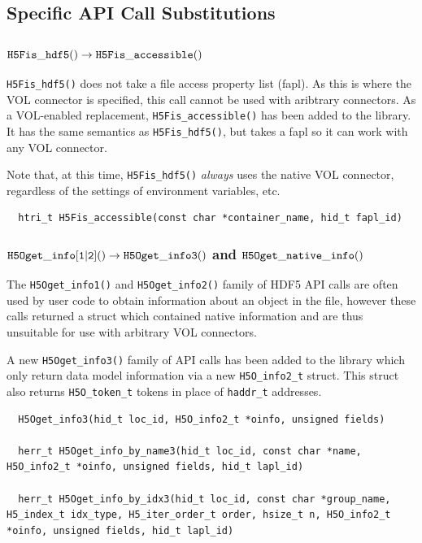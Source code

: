 \subsection{Specific API Call Substitutions}


\subsubsection{${\tt H5Fis\_hdf5()} \rightarrow {\tt H5Fis\_accessible()}$}

{\tt H5Fis\_hdf5()} does not take a file access property list (fapl). As this is where the VOL connector is specified, this call cannot be used with aribtrary connectors. As a VOL-enabled replacement, {\tt H5Fis\_accessible()} has been added to the library. It has the same semantics as {\tt H5Fis\_hdf5()}, but takes a fapl so it can work with any VOL connector.

Note that, at this time, {\tt H5Fis\_hdf5()} \textit{always} uses the native VOL connector, regardless of the settings of environment variables, etc.

\begin{lstlisting}
  htri_t H5Fis_accessible(const char *container_name, hid_t fapl_id)
\end{lstlisting}


\subsubsection{${\tt H5Oget\_info[1|2]()} \rightarrow {\tt H5Oget\_info3()}$ and ${\tt H5Oget\_native\_info()}$}

The {\tt H5Oget\_info1()} and {\tt H5Oget\_info2()} family of HDF5 API calls are often
used by user code to obtain information about an object in the file, however these
calls returned a struct which contained native information and are thus unsuitable
for use with arbitrary VOL connectors.

A new {\tt H5Oget\_info3()} family of API calls has been added to the library which only
return data model information via a new {\tt H5O\_info2\_t} struct. This
struct also returns {\tt H5O\_token\_t} tokens in place of {\tt haddr\_t}
addresses.

\begin{lstlisting}
  H5Oget_info3(hid_t loc_id, H5O_info2_t *oinfo, unsigned fields)

  herr_t H5Oget_info_by_name3(hid_t loc_id, const char *name, H5O_info2_t *oinfo, unsigned fields, hid_t lapl_id)

  herr_t H5Oget_info_by_idx3(hid_t loc_id, const char *group_name, H5_index_t idx_type, H5_iter_order_t order, hsize_t n, H5O_info2_t *oinfo, unsigned fields, hid_t lapl_id)
\end{lstlisting}

